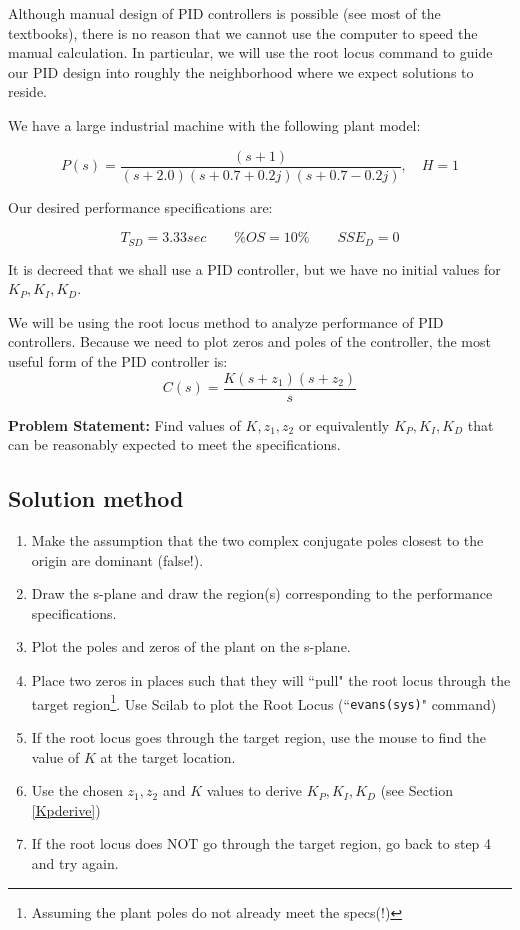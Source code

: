 Although manual design of PID controllers is possible (see most of the textbooks), there is no reason that we cannot use the computer to speed the manual calculation.   In particular, we will use the root locus command to guide our PID design into roughly the neighborhood where we expect solutions to reside. 



\begin{Example}

We have a large industrial machine with the following plant model:

\[
P(s) = \frac {(s+1)} {(s+2.0)(s+0.7+0.2j)(s+0.7-0.2j)}, \quad H=1
\]
 

Our desired performance specifications are:

\[
T_{SD} = 3.33 sec  \qquad 
\%OS = 10\%        \qquad
SSE_D = 0
\] 

It is decreed that we shall use a PID controller, but we have no initial values for $K_P, K_I, K_D$. 

We will be using the root locus method to analyze performance of PID controllers.  Because we need to plot zeros and poles of the controller,  the most useful form of the PID controller is:
\[
C(s) = \frac{K(s+z_1)(s+z_2)}{s}
\]


{\bf Problem Statement: }  Find values of $K, z_1, z_2$ or equivalently $K_P, K_I, K_D$ that can be reasonably expected to meet the specifications. 


\subsection{Solution method}

\begin{enumerate}
 \item Make the assumption that the two complex conjugate poles closest to the origin are dominant (false!).
 \item Draw the s-plane and draw the region(s) corresponding to the performance specifications.
 \item Plot the poles and zeros of the plant on the s-plane.
 \item Place two zeros in places such that they will ``pull" the root locus through the target region\footnote{Assuming the plant poles do not already meet the specs(!)}. Use Scilab to plot the Root Locus (``{\tt evans(sys)}" command)
  \item If the root locus goes through the target region, use the mouse to find the value of $K$ at the target location.
  \item Use the chosen $z_1, z_2$ and $K$ values to derive  $K_P, K_I, K_D$ (see Section \ref{Kpderive})
  \item If the root locus does NOT go through the target region, go back to step 4 and try again. 
\end{enumerate} 

\end{Example}

